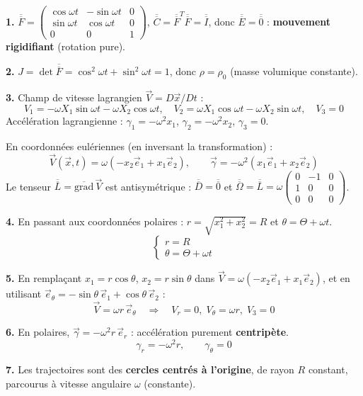 \documentclass[12pt,a4paper]{article}
\begin{document}
\begin{boitecorrige}
\textbf{1.} $\overline{\overline{F}} = \begin{pmatrix}\cos\omega t & -\sin\omega t & 0\\ \sin\omega t & \cos\omega t & 0\\ 0 & 0 & 1\end{pmatrix}$, $\overline{\overline{C}} = \overline{\overline{F}}^T\overline{\overline{F}} = \overline{\overline{I}}$, donc $\overline{\overline{E}} = \overline{\overline{0}}$ : \textbf{mouvement rigidifiant} (rotation pure).

\textbf{2.} $J = \det\overline{\overline{F}} = \cos^2\omega t + \sin^2\omega t = 1$, donc $\rho = \rho_0$ (masse volumique constante).

\textbf{3.} Champ de vitesse lagrangien $\vec{V} = D\vec{x}/Dt$ :
\[
V_1 = -\omega X_1\sin\omega t - \omega X_2\cos\omega t, \quad V_2 = \omega X_1\cos\omega t - \omega X_2\sin\omega t, \quad V_3 = 0
\]
Accélération lagrangienne : $\gamma_1 = -\omega^2 x_1$, $\gamma_2 = -\omega^2 x_2$, $\gamma_3 = 0$.

En coordonnées eulériennes (en inversant la transformation) :
\[
\vec{V}(\vec{x},t) = \omega(-x_2\vec{e}_1 + x_1\vec{e}_2), \qquad \vec{\gamma} = -\omega^2(x_1\vec{e}_1 + x_2\vec{e}_2)
\]
Le tenseur $\overline{\overline{L}} = \overline{\mathrm{grad}}\,\vec{V}$ est antisymétrique : $\overline{\overline{D}} = \overline{\overline{0}}$ et $\overline{\overline{\Omega}} = \overline{\overline{L}} = \omega\begin{pmatrix}0&-1&0\\1&0&0\\0&0&0\end{pmatrix}$.

\textbf{4.} En passant aux coordonnées polaires : $r = \sqrt{x_1^2+x_2^2} = R$ et $\theta = \Theta + \omega t$.
\[
\begin{cases} r = R \\ \theta = \Theta + \omega t \end{cases}
\]

\textbf{5.} En remplaçant $x_1 = r\cos\theta$, $x_2 = r\sin\theta$ dans $\vec{V} = \omega(-x_2\vec{e}_1 + x_1\vec{e}_2)$, et en utilisant $\vec{e}_\theta = -\sin\theta\,\vec{e}_1 + \cos\theta\,\vec{e}_2$ :
\[
\vec{V} = \omega r\,\vec{e}_\theta \quad\Longrightarrow\quad V_r = 0,\; V_\theta = \omega r,\; V_3 = 0
\]

\textbf{6.} En polaires, $\vec{\gamma} = -\omega^2 r\,\vec{e}_r$ : accélération purement \textbf{centripète}.
\[
\gamma_r = -\omega^2 r, \qquad \gamma_\theta = 0
\]

\textbf{7.} Les trajectoires sont des \textbf{cercles centrés à l'origine}, de rayon $R$ constant, parcourus à vitesse angulaire $\omega$ (constante).
\end{boitecorrige}
\end{document}
